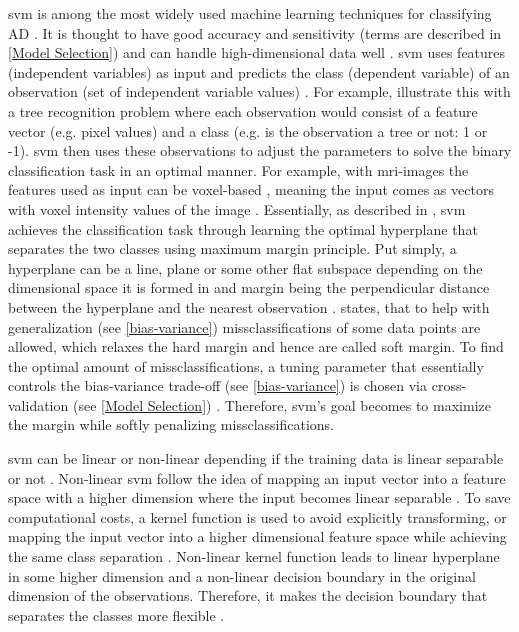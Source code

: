 \gls{svm} is among the most widely used machine learning techniques for classifying \gls{AD} \autocite{tanveerMachineLearningTechniques2020}. It is thought to have good accuracy and sensitivity (terms are described in \ref{Model Selection}) and can handle high-dimensional data well \autocite{toshkhujaevClassificationAlzheimerDisease2020}. 
\gls{svm} uses features (independent variables) as input and predicts the class (dependent variable) of an observation (set of independent variable values) \autocite{pereiraMachineLearningClassifiers2009}. For example, \textcite{burges1998tutorial} illustrate this with a tree recognition problem where each observation would consist of a feature vector (e.g. pixel values) and a class (e.g. is the observation a tree or not: 1 or -1). \gls{svm} then uses these observations to adjust the parameters to solve the binary classification task in an optimal manner. For example, with \gls{mri}-images the features used as input can be voxel-based \autocite{tohkaComparisonFeatureSelection2016}, meaning the input comes as vectors with voxel intensity values of the image \autocite{ebrahimighahnaviehDeepLearningDetect2020}. 
Essentially, as described in \textcite{bishop2006pattern}, \gls{svm} achieves the classification task through learning the optimal hyperplane that separates the two classes using maximum margin principle.  Put simply, a hyperplane can be a line, plane or some other flat subspace depending on the dimensional space it is formed in and margin being the perpendicular distance between the hyperplane and the nearest observation \autocite{introtostat}. \textcite{bishop2006pattern} states, that to help with generalization (see \ref{bias-variance}) missclassifications of some data points are allowed, which relaxes the hard margin and hence are called soft margin. To find the optimal amount of missclassifications, a tuning parameter that essentially controls the bias-variance trade-off (see \ref{bias-variance}) is chosen via cross-validation (see \ref{Model Selection}) \autocite{introtostat}.
Therefore, \gls{svm}'s goal becomes to maximize the margin while softly penalizing missclassifications. 


\gls{svm} can be linear or non-linear depending if the training data is linear separable or not \autocite{burges1998tutorial}. Non-linear \gls{svm} follow the idea of mapping an input vector into a feature space with a higher dimension where the input becomes linear separable \autocite{natureofstat}. To save computational costs, a kernel function is used  to avoid explicitly transforming, or mapping the input vector into a higher dimensional feature space while achieving the same class separation \autocite{burges1998tutorial}. Non-linear kernel function leads to linear hyperplane in some higher dimension and a non-linear decision boundary in the original dimension of the observations. Therefore, it makes the decision boundary that separates the classes more flexible \autocite{introtostat}.

